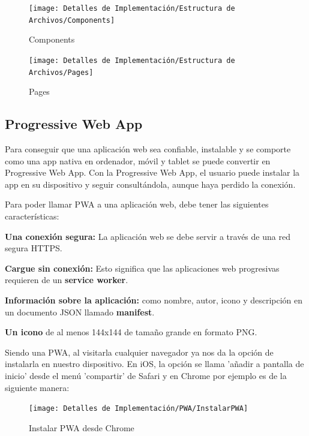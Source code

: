 \documentclass[12pt,twoside,titlepage]{report}
\begin{document}
\begin{figure}[H]
    \centering
    \texttt{[image: Detalles de Implementación/Estructura de Archivos/Components]}
    \label{fig:Components}
    \caption{Components}
\end{figure}

\begin{figure}[H]
    \centering
    \texttt{[image: Detalles de Implementación/Estructura de Archivos/Pages]}
    \label{fig:Pages}
    \caption{Pages}
\end{figure}

\subsection{Progressive Web App}
Para conseguir que una aplicación web sea confiable, instalable y se comporte como una app nativa en ordenador, móvil y tablet se puede convertir en Progressive Web App. Con la Progressive Web App, el usuario puede instalar la app en su dispositivo y seguir consultándola, aunque haya perdido la conexión.

Para poder llamar PWA a una aplicación web, debe tener las siguientes características:

\begin{compactitem}

    \item \textbf{Una conexión segura:} La aplicación web se debe servir a través de una red segura HTTPS.
    \item \textbf{Cargue sin conexión:} Esto significa que las aplicaciones web progresivas requieren de un \textbf{service worker}.
    \item \textbf{Información sobre la aplicación:} como nombre, autor, icono y descripción en un documento JSON llamado \textbf{manifest}.
    \item \textbf{Un icono} de al menos 144x144 de tamaño grande en formato PNG.
\end{compactitem}

Siendo una PWA, al visitarla cualquier navegador ya nos da la opción de instalarla en nuestro dispositivo. En iOS, la opción se llama 'añadir a pantalla de inicio' desde el menú 'compartir' de Safari y en Chrome por ejemplo es de la siguiente manera:

\begin{figure}[H]
    \centering
    \texttt{[image: Detalles de Implementación/PWA/InstalarPWA]}
    \label{fig:InstalarPWA}
    \caption{Instalar PWA desde Chrome}
\end{figure}
\end{document}
